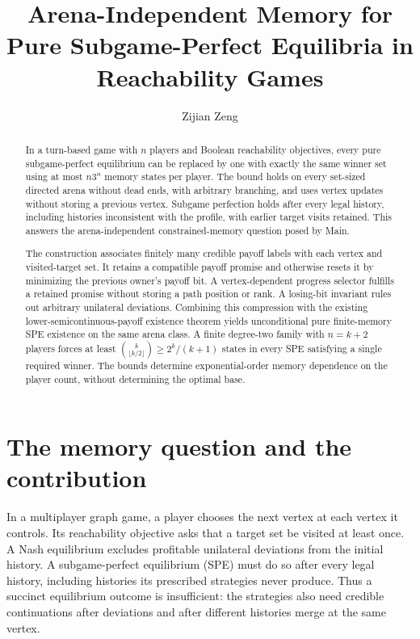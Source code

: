 \documentclass[acmlarge,11pt,screen,nonacm,natbib=false]{acmart}
\title[Arena-Independent Memory for Reachability SPEs]{Arena-Independent Memory for Pure Subgame-Perfect Equilibria in Reachability Games}
\author{Zijian Zeng}
\affiliation{\institution{UCSI University}\country{Malaysia}}
\theoremstyle{remark}
\begin{document}
\begin{abstract}
\normalsize
In a turn-based game with $n$ players and Boolean reachability objectives,
every pure subgame-perfect equilibrium can be replaced by one with exactly
the same winner set using at most $n3^n$ memory states per player. The bound
holds on every set-sized directed arena without dead ends, with arbitrary
branching, and uses vertex updates without storing a previous vertex.
Subgame perfection holds after every legal history, including histories
inconsistent with the profile, with earlier target visits retained.
This answers the arena-independent constrained-memory question posed by Main.

The construction associates finitely many credible payoff labels with each
vertex and visited-target set. It retains a compatible payoff promise and
otherwise resets it by minimizing the previous owner's payoff bit. A
vertex-dependent progress selector fulfills a retained promise without
storing a path position or rank. A losing-bit invariant rules out arbitrary
unilateral deviations. Combining this compression with the existing
lower-semicontinuous-payoff existence theorem yields unconditional pure
finite-memory SPE existence on the same arena class. A finite degree-two
family with $n=k+2$ players forces at least
$\binom{k}{\lfloor k/2\rfloor}\geq 2^k/(k+1)$ states in every SPE satisfying
a single required winner. The bounds determine exponential-order memory
dependence on the player count, without determining the optimal base.
\end{abstract}
\maketitle
{}
\thispagestyle{plain}
\clearpage

\section{The memory question and the contribution}

In a multiplayer graph game, a player chooses the next vertex at each vertex
it controls. Its reachability objective asks that a target set be visited
at least once. A Nash equilibrium excludes profitable unilateral deviations
from the initial history. A subgame-perfect equilibrium (SPE) must do so
after every legal history, including histories its prescribed strategies
never produce. Thus a succinct equilibrium outcome is insufficient:
the strategies also need credible continuations after deviations and after
different histories merge at the same vertex.
\end{document}
